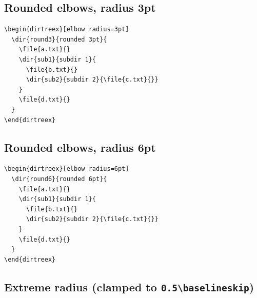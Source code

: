\documentclass[11pt]{article}
\begin{document}
\begin{dirtreex}[elbow radius=0pt]
\end{dirtreex}

\subsection{Rounded elbows, radius 3pt}

\begin{Verbatim}
\begin{dirtreex}[elbow radius=3pt]
  \dir{round3}{rounded 3pt}{
    \file{a.txt}{}
    \dir{sub1}{subdir 1}{
      \file{b.txt}{}
      \dir{sub2}{subdir 2}{\file{c.txt}{}}
    }
    \file{d.txt}{}
  }
\end{dirtreex}
\end{Verbatim}

\begin{dirtreex}[elbow radius=3pt]
\end{dirtreex}

\subsection{Rounded elbows, radius 6pt}

\begin{Verbatim}
\begin{dirtreex}[elbow radius=6pt]
  \dir{round6}{rounded 6pt}{
    \file{a.txt}{}
    \dir{sub1}{subdir 1}{
      \file{b.txt}{}
      \dir{sub2}{subdir 2}{\file{c.txt}{}}
    }
    \file{d.txt}{}
  }
\end{dirtreex}
\end{Verbatim}

\begin{dirtreex}[elbow radius=6pt]
\end{dirtreex}

\subsection{Extreme radius (clamped to \texttt{0.5\textbackslash baselineskip})}
\end{document}
